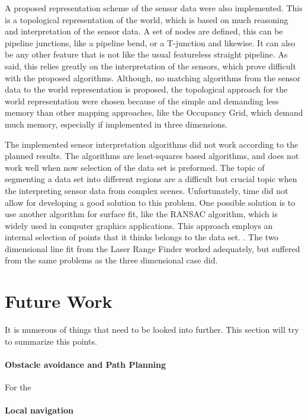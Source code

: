 A proposed representation scheme of the sensor data were also implemented. This is a
topological representation of the world, which is based on much reasoning and
interpretation of the sensor data. A set of nodes are defined, this can be pipeline
junctions, like a pipeline bend, or a T-junction and likewise. It can also be any other
feature that is not like the usual featureless straight pipeline. As said, this relies
greatly on the interpretation of the sensors, which prove difficult with the proposed
algorithms. Although, no matching algorithms from the sensor data to the world
representation is proposed, the topological approach for the world representation were
chosen because of the simple and demanding less memory than other mapping approaches, like
the Occupancy Grid, which demand much memory, especially if implemented in three
dimensions. 

The implemented sensor interpretation algorithms did not work according to the planned
results. The algorithms are least-squares based algorithms, and does not work well when
now selection of the data set is preformed. The topic of segmenting a data set into
different regions are a difficult but crucial topic when the interpreting sensor data from
complex scenes. Unfortunately, time did not allow for developing a good solution to this
problem. One possible solution is to use another algorithm for surface fit, like the
RANSAC algorithm, which is widely used in computer graphics applications. This approach
employs an internal selection of points that it thinks belongs to the data set.
\cite{ransac}. The two dimensional line fit from the Laser Range Finder worked adequately,
but suffered from the same problems as the three dimensional case did. 



\section{Future Work}
It is numerous of things that need to be looked into further. This section will try to 
summarize this points. 

\paragraph{Obstacle avoidance and Path Planning} For the 

\paragraph{Local navigation}

